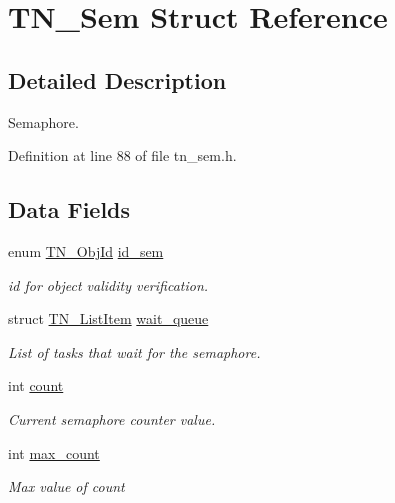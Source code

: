 \hypertarget{structTN__Sem}{}\section{T\+N\+\_\+\+Sem Struct Reference}
\label{structTN__Sem}


\subsection{Detailed Description}
Semaphore. 

Definition at line 88 of file tn\+\_\+sem.\+h.

\subsection*{Data Fields}
\begin{DoxyCompactItemize}
\item 
enum \hyperlink{tn__common_8h_ae779dd1f6735f6e139fb70acd004d976}{T\+N\+\_\+\+Obj\+Id} \hyperlink{structTN__Sem_a810526e9b3d5595278ebb70e59a128e1}{id\+\_\+sem}
\begin{DoxyCompactList}\small\item\em id for object validity verification. \end{DoxyCompactList}\item 
\mbox{\label{structTN__Sem_ac6cf5b47221528a5ce024c60b92be280}} 
struct \hyperlink{structTN__ListItem}{T\+N\+\_\+\+List\+Item} \hyperlink{structTN__Sem_ac6cf5b47221528a5ce024c60b92be280}{wait\+\_\+queue}
\begin{DoxyCompactList}\small\item\em List of tasks that wait for the semaphore. \end{DoxyCompactList}\item 
\mbox{\label{structTN__Sem_a5a2358e2425da2930ef8e105a642822b}} 
int \hyperlink{structTN__Sem_a5a2358e2425da2930ef8e105a642822b}{count}
\begin{DoxyCompactList}\small\item\em Current semaphore counter value. \end{DoxyCompactList}\item 
\mbox{\label{structTN__Sem_abd62d79c3aace05abd7252f2058b1e5b}} 
int \hyperlink{structTN__Sem_abd62d79c3aace05abd7252f2058b1e5b}{max\+\_\+count}
\begin{DoxyCompactList}\small\item\em Max value of {\ttfamily count} \end{DoxyCompactList}\end{DoxyCompactItemize}


